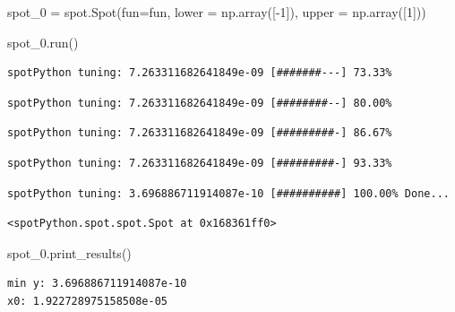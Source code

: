\documentclass[
  letterpaper,
  DIV=11,
  numbers=noendperiod]{scrreprt}
\newenvironment{Shaded}{\begin{snugshade}}{\end{snugshade}}
\newcommand{\DecValTok}[1]{\textcolor[rgb]{0.68,0.00,0.00}{#1}}
\newcommand{\NormalTok}[1]{\textcolor[rgb]{0.00,0.23,0.31}{#1}}
\newcommand{\OperatorTok}[1]{\textcolor[rgb]{0.37,0.37,0.37}{#1}}
\begin{document}
\begin{Shaded}
\begin{Highlighting}[]
\NormalTok{spot\_0 }\OperatorTok{=}\NormalTok{ spot.Spot(fun}\OperatorTok{=}\NormalTok{fun,}
\NormalTok{                   lower }\OperatorTok{=}\NormalTok{ np.array([}\OperatorTok{{-}}\DecValTok{1}\NormalTok{]),}
\NormalTok{                   upper }\OperatorTok{=}\NormalTok{ np.array([}\DecValTok{1}\NormalTok{]))}
\end{Highlighting}
\end{Shaded}

\begin{Shaded}
\begin{Highlighting}[]
\NormalTok{spot\_0.run()}
\end{Highlighting}
\end{Shaded}

\begin{verbatim}
spotPython tuning: 7.263311682641849e-09 [#######---] 73.33% 
\end{verbatim}

\begin{verbatim}
spotPython tuning: 7.263311682641849e-09 [########--] 80.00% 
\end{verbatim}

\begin{verbatim}
spotPython tuning: 7.263311682641849e-09 [#########-] 86.67% 
\end{verbatim}

\begin{verbatim}
spotPython tuning: 7.263311682641849e-09 [#########-] 93.33% 
\end{verbatim}

\begin{verbatim}
spotPython tuning: 3.696886711914087e-10 [##########] 100.00% Done...
\end{verbatim}

\begin{verbatim}
<spotPython.spot.spot.Spot at 0x168361ff0>
\end{verbatim}

\begin{Shaded}
\begin{Highlighting}[]
\NormalTok{spot\_0.print\_results()}
\end{Highlighting}
\end{Shaded}

\begin{verbatim}
min y: 3.696886711914087e-10
x0: 1.922728975158508e-05
\end{verbatim}
\end{document}
